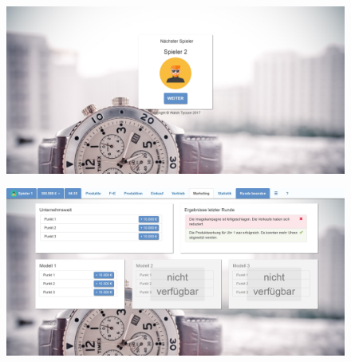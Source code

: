 \begin{figure} 
	\centering
	\includegraphics[scale=0.1]{img/bilder_layout/MockUp8.jpg} 
\end{figure}
\begin{figure} 
	\centering
	\includegraphics[scale=0.1]{img/bilder_layout/MockUp9.jpg} 
\end{figure}
\clearpage
